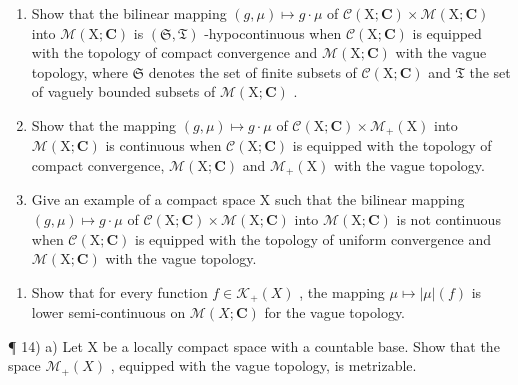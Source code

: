 \begin{enumerate}
\def\labelenumi{\alph{enumi})}
\setcounter{enumi}{1}
\item
  Show that the bilinear mapping \((g,\mu)\mapsto g\cdot \mu\) of \(\mathcal{C}(\mathrm{X};\mathbf{C})\times \mathcal{M}(\mathrm{X};\mathbf{C})\) into \(\mathcal{M}(\mathrm{X};\mathbf{C})\) is \((\mathfrak{S},\mathfrak{T})\) -hypocontinuous when \(\mathcal{C}(\mathrm{X};\mathbf{C})\) is equipped with the topology of compact convergence and \(\mathcal{M}(\mathrm{X};\mathbf{C})\) with the vague topology, where \(\mathfrak{S}\) denotes the set of finite subsets of \(\mathcal{C}(\mathrm{X};\mathbf{C})\) and \(\mathfrak{T}\) the set of vaguely bounded subsets of \(\mathcal{M}(\mathrm{X};\mathbf{C})\) .
\item
  Show that the mapping \((g, \mu) \mapsto g \cdot \mu\) of \(\mathcal{C}(\mathrm{X};\mathbf{C}) \times \mathcal{M}_{+}(\mathrm{X})\) into \(\mathcal{M}(\mathrm{X};\mathbf{C})\) is continuous when \(\mathcal{C}(\mathrm{X};\mathbf{C})\) is equipped with the topology of compact convergence, \(\mathcal{M}(\mathrm{X};\mathbf{C})\) and \(\mathcal{M}_{+}(\mathrm{X})\) with the vague topology.
\item
  Give an example of a compact space X such that the bilinear mapping \((g,\mu)\mapsto g\cdot\mu\) of \(\mathcal{C}(\mathrm{X};\mathbf{C})\times\mathcal{M}(\mathrm{X};\mathbf{C})\) into \(\mathcal{M}(\mathrm{X};\mathbf{C})\) is not continuous when \(\mathcal{C}(\mathrm{X};\mathbf{C})\) is equipped with the topology of uniform convergence and \(\mathcal{M}(\mathrm{X};\mathbf{C})\) with the vague topology.
\end{enumerate}

\begin{enumerate}
\def\labelenumi{\arabic{enumi})}
\setcounter{enumi}{12}
\tightlist
\item
  Show that for every function \(f \in \mathcal{K}_{+}(X)\) , the mapping \(\mu \mapsto |\mu|(f)\) is lower semi-continuous on \(\mathcal{M}(X; \mathbf{C})\) for the vague topology.
\end{enumerate}

¶ 14) a) Let X be a locally compact space with a countable base. Show that the space \(\mathcal{M}_{+}(X)\) , equipped with the vague topology, is metrizable.

